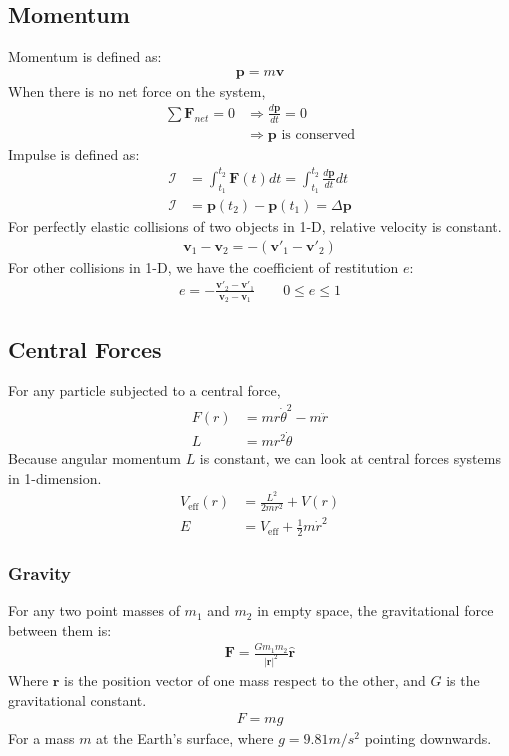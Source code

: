 \documentclass[11pt]{article}
\newcommand{\Imp}{\mathcal{I}}					%
\newcommand{\ve}[1]{\ensuremath{\bm{#1}}}			%
\begin{document}
\begin{multicols*}{3}
\subsection{Momentum}
Momentum is defined as:
	\begin{align*}
	\ve{p} = m \ve{v}
	\end{align*}
When there is no net force on the system,
	\begin{align*}
	\sum \ve{F}_{net} = 0 &\Rightarrow \frac{d\ve{p}}{dt} = 0 \\
	&\Rightarrow \ve{p} \text{ is conserved}
	\end{align*}
Impulse is defined as:
	\begin{align*}
	\Imp &= \int_{t_1}^{t_2} \ve{F}(t) dt = \int_{t_1}^{t_2} \frac{d\ve{p}}{dt} dt \\
	\Imp &= \ve{p}(t_2) - \ve{p}(t_1) = \Delta \ve{p}
	\end{align*}
For perfectly elastic collisions of two objects in 1-D, relative velocity is constant. 
	\begin{align*}
	\ve{v}_1 - \ve{v}_2 = - (\ve{v}'_1 - \ve{v}'_2)
	\end{align*}
For other collisions in 1-D, we have the coefficient of restitution $e$:
	\begin{align*}
	e = -\frac{\ve{v}'_2 - \ve{v}'_1}{\ve{v}_2 - \ve{v}_1} \qquad 0 \leq e \leq  1
	\end{align*}
\subsection{Central Forces}
For any particle subjected to a central force,
	\begin{align*}
	F(r) &= m r \dot{\theta}^2 - m \ddot{r} \\
	L &= mr^2\dot{\theta}
	\end{align*}
Because angular momentum $L$ is constant, we can look at central forces systems in 1-dimension.
	\begin{align*}
	V_{\text{eff}}(r) &= \frac{L^2}{2mr^2} + V(r) \\
	E &= V_{\text{eff}} + \frac{1}{2} m \dot{r}^2
	\end{align*}
\subsubsection{Gravity}
For any two point masses of $m_1$ and $m_2$ in empty space, the gravitational force between them is:
	\begin{align*}
	\ve{F}=\frac{Gm_1m_2}{|\ve{r}|^2}\hat{\ve{r}}
	\end{align*}
Where $\ve{r}$ is the position vector of one mass respect to the other, and $G$ is the gravitational constant.
	\begin{align*}
	F=mg
	\end{align*}
\noindent For a mass $m$ at the Earth's surface, where $g=9.81m/s^2$ pointing downwards.

\end{multicols*}
\end{document}
